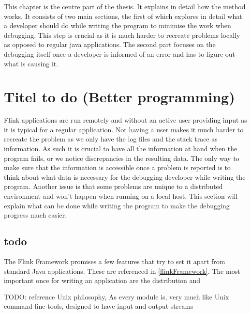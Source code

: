 
This chapter is the centre part of the thesis. It explains in detail how the method works. It consists of two main sections, the first of which explores in detail what a developer should do while writing the program to minimise the work when debugging. This step is crucial as it is much harder to recreate problems locally as opposed to regular java applications. The second part focuses on the debugging itself once a developer is informed of an error and has to figure out what is causing it.

\section{Titel to do (Better programming)}
Flink applications are run remotely and without an active user providing input as it is typical for a regular application. Not having a user makes it much harder to recreate the problem as we only have the log files and the stack trace as information. As such it is crucial to have all the information at hand when the program fails, or we notice discrepancies in the resulting data. The only way to make sure that the information is accessible once a problem is reported is to think about what data is necessary for the debugging developer while writing the program. Another issue is that some problems are unique to a distributed environment and won't happen when running on a local host. This section will explain what can be done while writing the program to make the debugging progress much easier.

\subsection{todo}
The Flink Framework promises a few features that try to set it apart from standard Java applications. These are referenced in \ref{flinkFramework}. The most important once for writing an application are the distribution and

TODO: reference Unix philosophy, As every module is, very much like Unix command line tools, designed to have input and output streams

